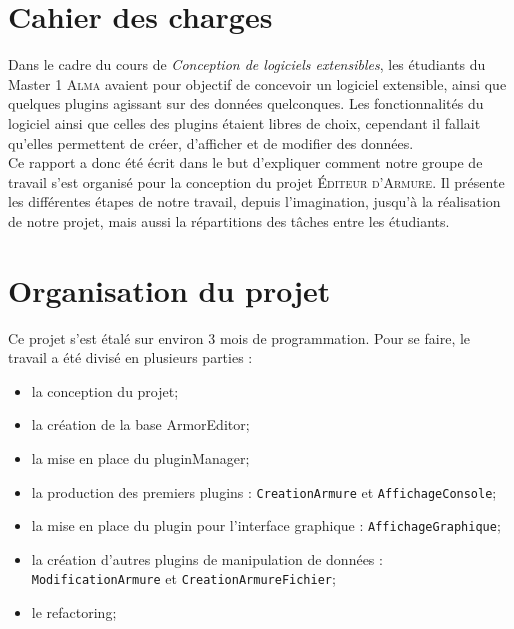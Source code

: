 \documentclass[a4paper]{article}
\begin{document}



\section{Cahier des charges}

Dans le cadre du cours de \textit{Conception de logiciels extensibles}, les étudiants du Master 1 \textsc{Alma} avaient pour objectif de concevoir un logiciel extensible, ainsi que quelques plugins agissant sur des données quelconques. Les fonctionnalités du logiciel ainsi que celles des plugins étaient libres de choix, cependant il fallait qu'elles permettent de créer, d'afficher et de modifier des données.\\

Ce rapport a donc été écrit dans le but d'expliquer comment notre groupe de travail s'est organisé pour la conception du projet \textsc{\'Editeur d'Armure}. Il présente les différentes étapes de notre travail, depuis l'imagination, jusqu'à la réalisation de notre projet, mais aussi la répartitions des tâches entre les étudiants.



\section{Organisation du projet}

Ce projet s'est étalé sur environ 3 mois de programmation. Pour se faire, le travail a été divisé en plusieurs parties :
\begin{itemize}
	\item la conception du projet;
	\item la création de la base ArmorEditor;
	\item la mise en place du pluginManager;
	\item la production des premiers plugins : \texttt{CreationArmure} et \texttt{AffichageConsole};
	\item la mise en place du plugin pour l'interface graphique : \texttt{AffichageGraphique};
	\item la création d'autres plugins de manipulation de données : \texttt{ModificationArmure} et \texttt{CreationArmureFichier};
	\item le refactoring;
\end{itemize}
\vspace{0.5cm}
\end{document}
